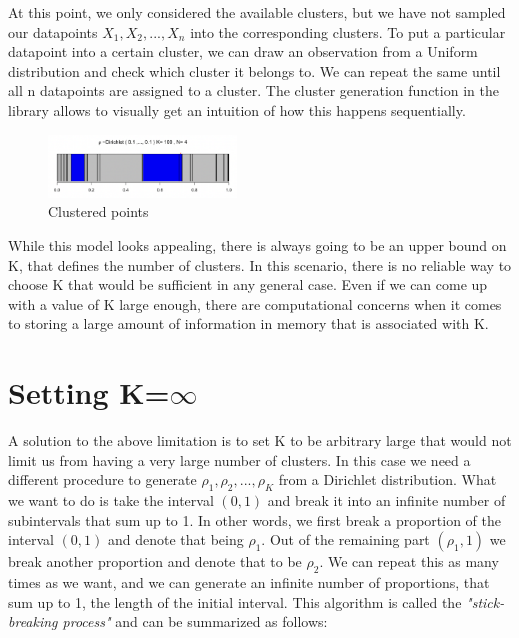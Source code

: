 \documentclass[12pt,a4paper]{article}
\begin{document}
At this point, we only considered the available clusters, but we have not sampled our datapoints $X_{1}, X_{2}, ..., X_{n}$ into the corresponding clusters. To put a particular datapoint into a certain cluster, we can draw an observation from a Uniform distribution and check which cluster it belongs to. We can repeat the same until all n datapoints are assigned to a cluster. The cluster generation function in the library allows to visually get an intuition of how this happens sequentially. 

\begin{figure} [H]
    \begin{center}
        \includegraphics[scale=1, width=5cm]{clustered_points.png}
        \caption{Clustered points}
        \label{fig:clustered_points}
    \end{center}
\end{figure}

While this model looks appealing, there is always going to be an upper bound on K, that defines the number of clusters. In this scenario, there is no reliable way to choose K that would be sufficient in any general case. Even if we can come up with a value of K large enough, there are computational concerns when it comes to storing a large amount of information in memory that is associated with K.

\section{Setting K=$\infty$}
A solution to the above limitation is to set K to be arbitrary large that would not limit us from having a very large number of clusters. In this case we need a different procedure to generate $\rho_{1}, \rho_{2}, ..., \rho_{K}$ from a Dirichlet distribution. What we want to do is take the interval $(0, 1)$ and break it into an infinite number of subintervals that sum up to 1. In other words, we first break a proportion of the interval $(0, 1)$ and denote that being $\rho_{1}$. Out of the remaining part $(\rho_{1}, 1)$ we break another proportion and denote that to be $\rho_{2}$. We can repeat this as many times as we want, and we can generate an infinite number of proportions, that sum up to 1, the length of the initial interval. This algorithm is called the \textit{"stick-breaking process"} and can be summarized as follows: 
\end{document}
